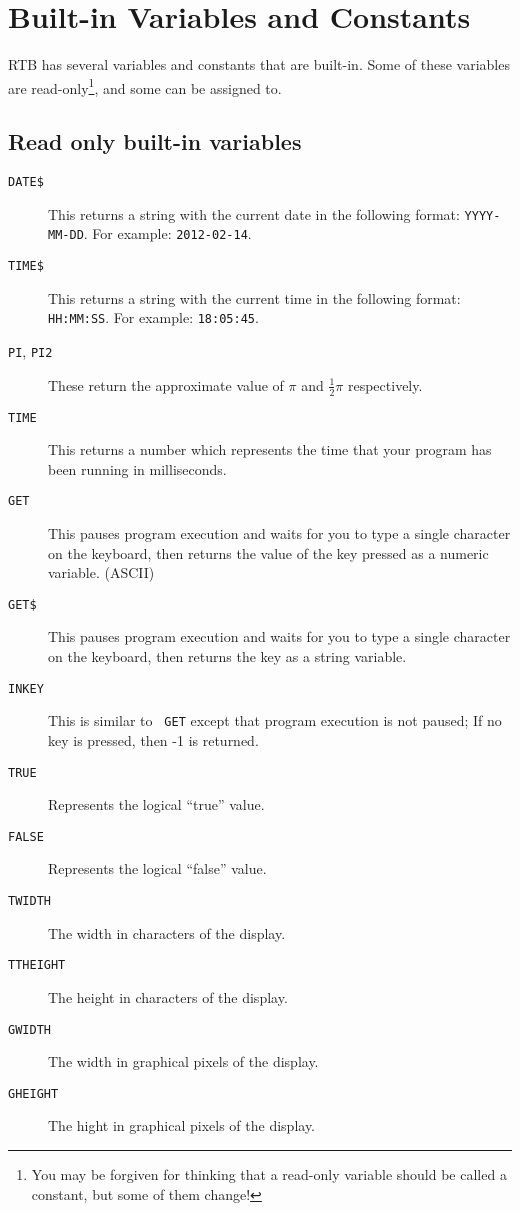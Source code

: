\chapter{Built-in Variables and Constants}

RTB has several variables and constants that are built-in. Some of these
variables are read-only\footnote{You may be forgiven for thinking that a
read-only variable should be called a constant, but some of them change!},
and some can be assigned to.

\section{Read only built-in variables}
\begin{description}
\item[{\tt DATE\$}] This returns a string with the current date
in the following format: {\tt YYYY-MM-DD}. For example: {\tt 2012-02-14}.
\item[{\tt TIME\$}] This returns a string with
the current time in the following format: {\tt HH:MM:SS}. For example:
{\tt 18:05:45}.
\item[{\tt PI}, {\tt PI2}] These return the
approximate value of $\pi$ and $\frac{1}{2}\pi$ respectively.
\item[{\tt TIME}] This returns a number which
represents the time that your program has been running in milliseconds.
\setcounter{seedVariable}{\value{page}}
\item[{\tt GET}] This pauses program execution
and waits for you to type a single character on the keyboard, then
returns the value of the key pressed as a numeric variable. (ASCII)
\item[{\tt GET\$}] This pauses program execution
and waits for you to type a single character on the keyboard, then
returns the key as a string variable.
\item[{\tt INKEY}] This is similar to {\tt
GET} except that program execution is not paused; If no key is pressed,
then -1 is returned.
\item[{\tt TRUE}] Represents the logical ``true'' value.
\item[{\tt FALSE}] Represents the logical ``false'' value.
\item[{\tt TWIDTH}] The width in characters of the display.
\item[{\tt TTHEIGHT}] The height in characters of the display.
\item[{\tt GWIDTH}] The width in graphical pixels of the display.
\item[{\tt GHEIGHT}] The hight in graphical pixels of the display.
\end{description}

